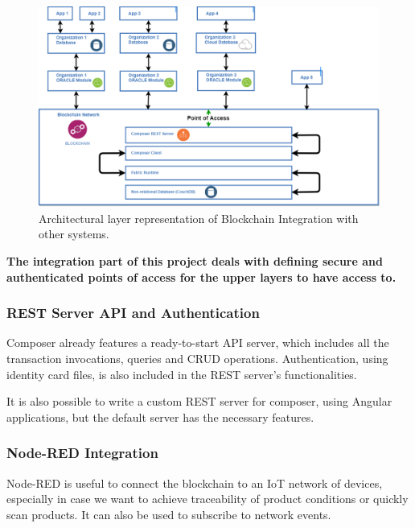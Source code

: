\begin{figure}[h]
    \centering
    \includegraphics[scale=0.40]{media/architectural_diagram.png}
    \caption[Architectural layer representation of Blockchain Integration with other systems.]{Architectural layer representation of Blockchain Integration with other systems.}
    \label{fig:architectural_diagram}
\end{figure}

\textbf{The integration part of this project deals with defining secure and authenticated points of access for the upper layers to have access to.}

\subsubsection*{REST Server API and Authentication}
Composer already features a ready-to-start API server, which includes all the transaction invocations, queries and CRUD operations. Authentication, using identity card files, is also included in the REST server's functionalities.

It is also possible to write a custom REST server for composer, using Angular applications, but the default server has the necessary features.

\subsubsection*{Node-RED Integration}
Node-RED is useful to connect the blockchain to an IoT network of devices, especially in case we want to achieve traceability of product conditions or quickly scan products. It can also be used to subscribe to network events.
